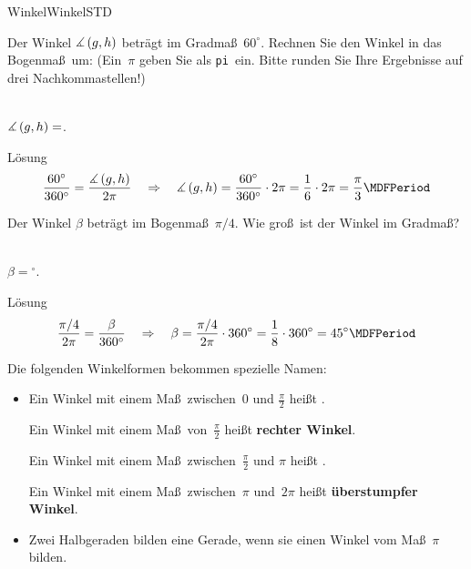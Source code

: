 \begin{MXContent}{Winkel}{Winkel}{STD}
\begin{MExercise}
Der Winkel $\measuredangle\left(g, h\right)$ betr\"agt im Gradma\ss\ $60^\circ$. Rechnen Sie den Winkel in das Bogenma\ss\ um:
\ifttm%
(Ein~$\pi$ geben Sie als \glqq\texttt{pi}\grqq\ ein. Bitte runden Sie Ihre Ergebnisse auf drei Nachkommastellen!)
\fi

\ \\
$\measuredangle\left(g, h\right)=$.
\ \\
\begin{MHint}{L\"osung}
\[\frac{60^\circ}{360^\circ}=\frac{\Mmeasuredangle\left(g, h\right)}{2\pi} \quad\Rightarrow\quad \Mmeasuredangle\left(g, h\right)=\frac{60^\circ}{360^\circ}\cdot 2\pi=\frac{1}{6}\cdot 2\pi=\frac{\pi}{3}\MDFPeriod\]
\end{MHint}

\end{MExercise}

\begin{MExercise}
Der Winkel $\beta$ betr\"agt im Bogenma\ss\ $\pi/4$. Wie gro\ss\ ist der Winkel im Gradma\ss ?

\ \\
$\beta=$$^\circ$.
\ \\
\begin{MHint}{L\"osung}
\[\frac{\pi/4}{2\pi}=\frac{\beta}{360^\circ}\quad\Rightarrow\quad \beta=\frac{\pi/4}{2\pi}\cdot 360^\circ=\frac{1}{8}\cdot 360^\circ=45^\circ \MDFPeriod\]
\end{MHint}
\end{MExercise}

\begin{MInfo}%
Die folgenden Winkelformen bekommen spezielle Namen:
\begin{itemize}
\item
Ein Winkel mit einem Ma\ss\ zwischen~$0$ und $\frac{\pi}{2}$ hei\ss t .
       
Ein Winkel mit einem Ma\ss\ von~$\frac{\pi}{2}$ hei\ss t \textbf{rechter Winkel}.
       
Ein Winkel mit einem Ma\ss\ zwischen~$\frac{\pi}{2}$ und $\pi$ hei\ss t .
       
Ein Winkel mit einem Ma\ss\ zwischen~$\pi$ und~$2 \pi$ hei\ss t \textbf{\"uberstumpfer Winkel}.

 \item Zwei Halbgeraden bilden eine Gerade, wenn sie einen Winkel vom Ma\ss~$\pi$ bilden.
 

\end{itemize}
\end{MInfo}
\end{MXContent}
